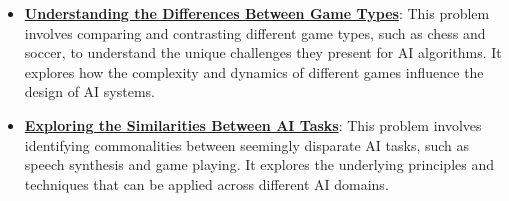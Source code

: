 \documentclass{article}%
\begin{document}
\begin{itemize}[leftmargin=*]
\item \href{https://purdue.brightspace.com/d2l/common/assets/pdfjs-d2l-dist/1.0.14-legacy/web/viewer.html?file=%2Fcontent%2Fenforced%2F1095467-wl.202510.CS.24300.001%2F02L2-Intro.pdf%3Fou%3D1095467&lang=en-us&container=d2l-fileviewer-rendered-pdf&fullscreen=d2l-fileviewer-rendered-pdf-dialog&height=667#page=27}{\textbf{Understanding the Differences Between Game Types}}: This problem involves comparing and contrasting different game types, such as chess and soccer, to understand the unique challenges they present for AI algorithms. It explores how the complexity and dynamics of different games influence the design of AI systems.%
\item \href{https://purdue.brightspace.com/d2l/common/assets/pdfjs-d2l-dist/1.0.14-legacy/web/viewer.html?file=%2Fcontent%2Fenforced%2F1095467-wl.202510.CS.24300.001%2F02L2-Intro.pdf%3Fou%3D1095467&lang=en-us&container=d2l-fileviewer-rendered-pdf&fullscreen=d2l-fileviewer-rendered-pdf-dialog&height=667#page=31}{\textbf{Exploring the Similarities Between AI Tasks}}: This problem involves identifying commonalities between seemingly disparate AI tasks, such as speech synthesis and game playing. It explores the underlying principles and techniques that can be applied across different AI domains.%
\end{itemize}

%
\end{document}
